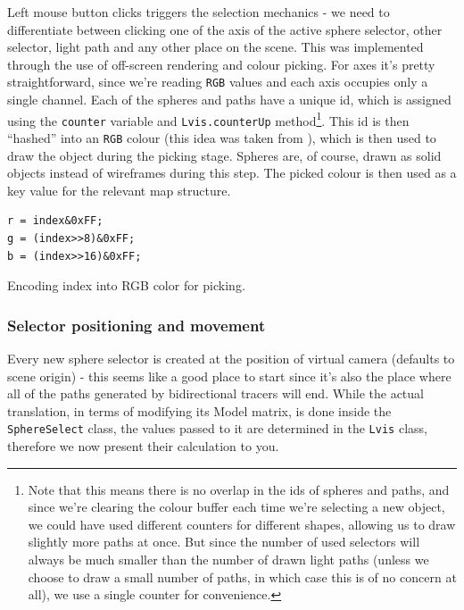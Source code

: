 Left mouse button clicks triggers the selection mechanics - we need to differentiate between clicking one of the axis of the active sphere selector, other selector, light path and any other place on the scene. This was implemented through the use of off-screen rendering and colour picking. For axes it's pretty straightforward, since we're reading \texttt{RGB} values and each axis occupies only a single channel. Each of the spheres and paths have a unique id, which is assigned using the \texttt{counter} variable and \texttt{Lvis.counterUp} method\footnote{Note that this means there is no overlap in the ids of spheres and paths, and since we're clearing the colour buffer each time we're selecting a new object, we could have used different counters for different shapes, allowing us to draw slightly more paths at once. But since the number of used selectors will always be much smaller than the number of drawn light paths (unless we choose to draw a small number of paths, in which case this is of no concern at all), we use a single counter for convenience.}. This id is then ``hashed''  into an \texttt{RGB} colour (this idea was taken from \cite{ColorPicking}), which is then used to draw the object during the picking stage. Spheres are, of course, drawn as solid objects instead of wireframes during this step. The picked colour is then used as a key value for the relevant map structure.

\begin{listing}
\begin{verbatim}
r = index&0xFF;
g = (index>>8)&0xFF;
b = (index>>16)&0xFF;
\end{verbatim}
\caption{Encoding index into RGB color for picking.}
\label{lst:hash}
\end{listing}

\subsubsection{Selector positioning and movement}

Every new sphere selector is created at the position of virtual camera (defaults to scene origin) - this seems like a good place to start since it's also the place where all of the paths generated by bidirectional tracers will end. While the actual translation, in terms of modifying its Model matrix, is done inside the \texttt{SphereSelect} class, the values passed to it are determined in the \texttt{Lvis} class, therefore we now present their calculation to you.

